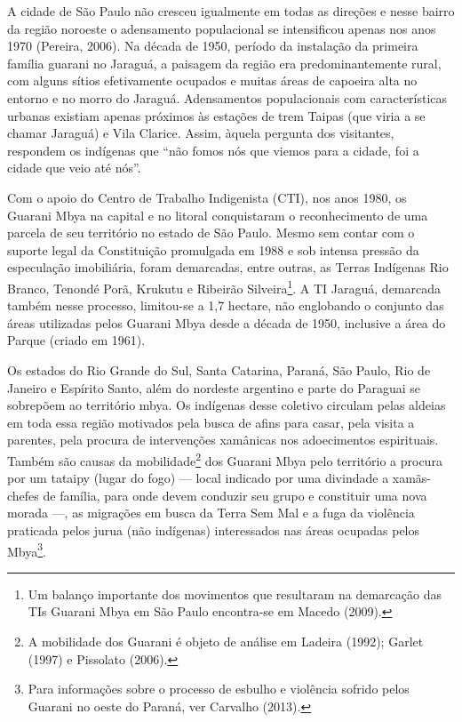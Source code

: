 \documentclass{article}
\begin{document}
A cidade de S\~ao Paulo n\~ao cresceu igualmente em todas as
dire\c{c}\~oes e nesse bairro da regi\~ao noroeste o adensamento
populacional se intensificou apenas nos anos 1970 (Pereira, 2006). Na
d\'ecada de 1950, per\'iodo da instala\c{c}\~ao da primeira fam\'ilia
guarani no Jaragu\'a, a paisagem da regi\~ao era predominantemente
rural, com alguns s\'itios efetivamente ocupados e muitas \'areas de
capoeira alta no entorno e no morro do Jaragu\'a. Adensamentos
populacionais com caracter\'isticas urbanas existiam apenas pr\'oximos
\`as esta\c{c}\~oes de trem Taipas (que viria a se chamar Jaragu\'a) e
Vila Clarice. Assim, \`aquela pergunta dos visitantes, respondem os
ind\'igenas que {\textquotedblleft}n\~ao fomos n\'os que viemos para a
cidade, foi a cidade que veio at\'e n\'os{\textquotedblright}. 

Com o apoio do Centro de Trabalho Indigenista (CTI), nos anos 1980, os
Guarani Mbya na capital e no litoral conquistaram o reconhecimento de
uma parcela de seu territ\'orio no estado de S\~ao Paulo. Mesmo sem
contar com o suporte legal da Constitui\c{c}\~ao promulgada em 1988 e
sob intensa press\~ao da especula\c{c}\~ao imobili\'aria, foram
demarcadas, entre outras, as Terras Ind\'igenas Rio Branco, Tenond\'e
Por\~a, Krukutu e Ribeir\~ao Silveira\footnote{ Um balan\c{c}o
importante dos movimentos que resultaram na demarca\c{c}\~ao das TIs
Guarani Mbya em S\~ao Paulo encontra-se em Macedo (2009).}. A TI
Jaragu\'a, demarcada tamb\'em nesse processo, limitou-se a 1,7 hectare,
n\~ao englobando o conjunto das \'areas utilizadas pelos Guarani Mbya
desde a d\'ecada de 1950, inclusive a \'area do Parque (criado em
1961).

Os estados do Rio Grande do Sul, Santa Catarina, Paran\'a, S\~ao Paulo,
Rio de Janeiro e Esp\'irito Santo, al\'em do nordeste argentino e parte
do Paraguai se sobrep\~oem ao territ\'orio mbya. Os ind\'igenas desse
coletivo circulam pelas aldeias em toda essa regi\~ao motivados pela
busca de afins para casar, pela visita a parentes, pela procura de
interven\c{c}\~oes xam\^anicas nos adoecimentos espirituais. Tamb\'em
s\~ao causas da mobilidade\footnote{ A mobilidade dos Guarani \'e
objeto de an\'alise em Ladeira (1992); Garlet (1997) e Pissolato
(2006).} dos Guarani Mbya pelo territ\'orio a procura por um tataipy
(lugar do fogo) --- local indicado por uma divindade a xam\~as-chefes
de fam\'ilia, para onde devem conduzir seu grupo e constituir uma nova
morada ---, as migra\c{c}\~oes em busca da Terra Sem Mal e a fuga da
viol\^encia praticada pelos jurua (n\~ao ind\'igenas) interessados nas
\'areas ocupadas pelos Mbya\footnote{ Para informa\c{c}\~oes sobre o
processo de esbulho e viol\^encia sofrido pelos Guarani no oeste do
Paran\'a, ver Carvalho (2013).}.
\end{document}
